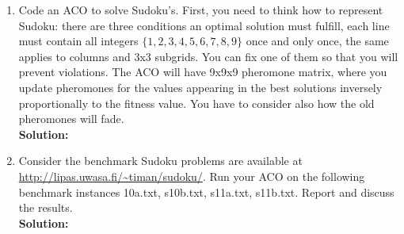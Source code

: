 \documentclass[a4paper]{article}
\begin{document}
\begin{enumerate}
	\begin{enumerate}
		\item Code an ACO to solve Sudoku's. First, you need to think how to represent Sudoku: there are three conditions an optimal solution must fulfill, each line must contain all integers $\{1,2,3,4,5,6,7,8,9 \}$ once and only once, the same applies to columns and 3x3 subgrids. You can fix one of them so that you will prevent violations. The ACO will have 9x9x9 pheromone matrix, where you update pheromones for the values appearing in the best solutions inversely proportionally to the fitness value. You have to consider also how the old pheromones will fade.\\
		\textbf{Solution:}\\
		
		
		\item Consider the benchmark Sudoku problems are available at \url{http://lipas.uwasa.fi/~timan/sudoku/}. Run your ACO on the following benchmark instances \textsf{10a.txt, s10b.txt, s11a.txt, s11b.txt}. Report and discuss the results.\\
		 \textbf{Solution:}\\
		
		
		
	\end{enumerate}
	
\end{enumerate}
\end{document}
